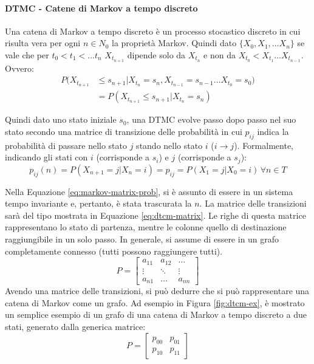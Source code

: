 \documentclass{article}
\begin{document}
\paragraph{DTMC - Catene di Markov a tempo discreto} Una catena di Markov a tempo discreto
è un processo stocastico discreto in cui risulta vera per ogni $n \in N_0$ la proprietà
Markov. Quindi dato $\{X_0, X_1, \dots X_n\}$ se vale che per $t_0 < t_1 < \dots t_n$
$X_{t_{n+1}}$ dipende solo da $X_{t_n}$ e non da $X_{t_0} < X_{t_1} \dots X_{t_{n-1}}$. 
Ovvero:
\begin{align}
  P(X_{t_{n+1}} &\leq s_{n+1} | X_{t_n} = s_n, X_{t_{n-1}} = s_{n-1}\dots X_{t_0} = s_0) \\
  &= P(X_{t_{n+1}} \leq s_{n+1}|X_{t_n} = s_n)
\end{align}

Quindi dato uno stato iniziale $s_0$, una DTMC evolve passo dopo passo nel suo stato 
secondo una matrice di transizione delle probabilità in cui $p_{ij}$ indica la probabilità
di passare nello stato $j$ stando nello stato $i$ ($i \to j$). Formalmente, indicando gli
stati con $i$ (corrisponde a $s_i$) e $j$ (corrisponde a $s_j$):
\begin{equation}
  p_{ij}(n) = P(X_{n+1} = j | X_n = i) = p_{ij} = P(X_1 = j | X_0 = i)\, \forall n \in T
  \label{eq:markov-matrix-prob}
\end{equation}

Nella Equazione \ref{eq:markov-matrix-prob}, si è assunto di essere in un sistema tempo 
invariante e, pertanto, è stata trascurata la $n$. La matrice delle transizioni sarà del 
tipo mostrata in Equazione \ref{eq:dtcm-matrix}. Le righe di questa matrice rappresentano
lo stato di partenza, mentre le colonne quello di destinazione raggiungibile in un solo passo.
In generale, si assume di essere in un grafo completamente connesso (tutti possono 
raggiungere tutti).
\begin{equation}
  P = \begin{bmatrix} 
    a_{11} & a_{12} & \dots \\
    \vdots & \ddots & \vdots \\
    a_{n1} & \dots & a_{nn} 
  \end{bmatrix}
  \label{eq:dtcm-matrix}
\end{equation}
Avendo una matrice delle transizioni, si può dedurre che si può rappresentare una catena di 
Markov come un grafo. Ad esempio in Figura \ref{fig:dtcm-ex}, è mostrato un semplice esempio 
di un grafo di una catena di Markov a tempo discreto a due stati, generato dalla generica
matrice:
\[
  P = \begin{bmatrix} 
    p_{00} & p_{01} \\
    p_{10} & p_{11} 
  \end{bmatrix}
\]
\end{document}
